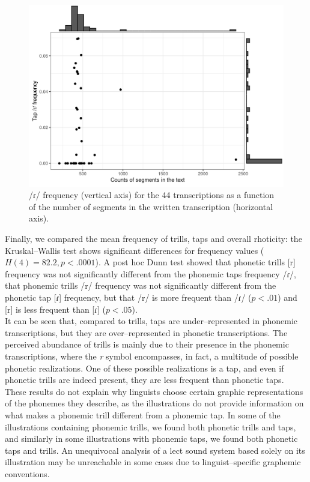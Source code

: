 \begin{figure}
	\centering
	\includegraphics[width=0.75\linewidth]{jipa/images/tap_phonemic_freq}
	\caption[\textrm{/ɾ/} frequency for the 44 transcriptions as a function of the number of segments in the written transcription]{\textrm{/ɾ/} frequency (vertical axis) for the 44 transcriptions as a function of the number of segments in the written transcription (horizontal axis).}
	\label{fig:tapphonemicfreq}
\end{figure}

Finally, we compared the mean frequency of trills, taps and overall rhoticity: the Kruskal–Wallis test shows significant differences for frequency values ($H(4)=82.2, p<.0001$). A post hoc Dunn test showed that phonetic trills [r] frequency was not significantly different from the phonemic taps frequency /ɾ/, that phonemic trills /r/ frequency was not significantly different from the phonetic tap [ɾ] frequency, but that /r/ is more frequent than /ɾ/ ($p<.01$) and [r] is less frequent than [ɾ] ($p<.05$).\\

It can be seen that, compared to trills, taps are under–represented in phonemic transcriptions, but they are over–represented in phonetic transcriptions. The perceived abundance of trills is mainly due to their presence in the phonemic transcriptions, where the \textit{r} symbol encompasses, in fact, a multitude of possible phonetic realizations. One of these possible realizations is a tap, and even if phonetic trills are indeed present, they are less frequent than phonetic taps. These results do not explain why linguists choose certain graphic representations of the phonemes they describe, as the illustrations do not provide information on what makes a phonemic trill different from a phonemic tap. In some of the illustrations containing phonemic trills, we found both phonetic trills and taps, and similarly in some illustrations with phonemic taps, we found both phonetic taps and trills. An unequivocal analysis of a lect sound system based solely on its illustration may be unreachable in some cases due to linguist–specific graphemic conventions.

